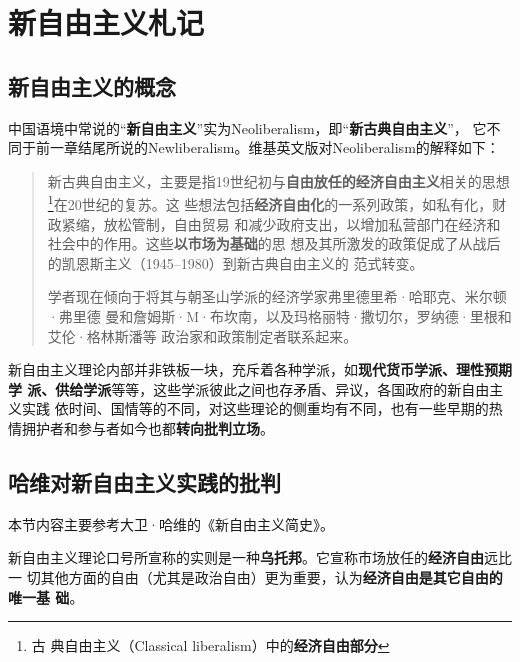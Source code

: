 \chapter{新自由主义札记}
\label{chap:neoliber}

\section{新自由主义的概念}
\label{sec:neoliberalism}


中国语境中常说的“\textbf{新自由主义}”实为Neoliberalism，即“\textbf{新古典自由主义}”，
它不同于前一章结尾所说的Newliberalism。维基英文版对Neoliberalism的解释如下：

\begin{quotation}
  新古典自由主义，主要是指19世纪初与\textbf{自由放任的经济自由主义}相关的思想\footnote{古
    典自由主义（Classical liberalism）中的\textbf{经济自由部分}}在20世纪的复苏。这
  些想法包括\textbf{经济自由化}的一系列政策，如私有化，财政紧缩，放松管制，自由贸易
  和减少政府支出，以增加私营部门在经济和社会中的作用。这些\textbf{以市场为基础}的思
  想及其所激发的政策促成了从战后的凯恩斯主义（1945--1980）到新古典自由主义的
  范式转变。

  学者现在倾向于将其与朝圣山学派的经济学家弗里德里希·哈耶克、米尔顿·弗里德
  曼和詹姆斯·M·布坎南，以及玛格丽特·撒切尔，罗纳德·里根和艾伦·格林斯潘等
  政治家和政策制定者联系起来。
\end{quotation}

新自由主义理论内部并非铁板一块，充斥着各种学派，如\textbf{现代货币学派、理性预期学
  派、供给学派}等等，这些学派彼此之间也存矛盾、异议，各国政府的新自由主义实践
依时间、国情等的不同，对这些理论的侧重均有不同\cite{neoxuepai}，也有一些早期的热
情拥护者和参与者如今也都\textbf{转向批判立场}。


\section{哈维对新自由主义实践的批判}

本节内容主要参考大卫·哈维的《新自由主义简史》。

新自由主义理论口号所宣称的实则是一种\textbf{乌托邦}。它宣称市场放任的\textbf{经济自由}远比一
切其他方面的自由（尤其是政治自由）更为重要，认为\textbf{经济自由是其它自由的唯一基
础}。

